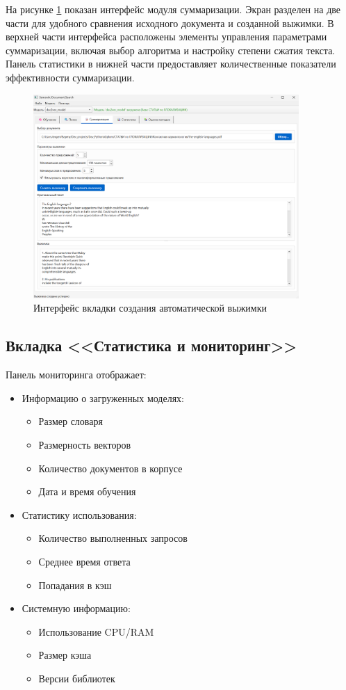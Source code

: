 На рисунке \ref{vizhimka} показан интерфейс модуля суммаризации. Экран разделен на две части для удобного сравнения исходного документа и созданной выжимки. В верхней части интерфейса расположены элементы управления параметрами суммаризации, включая выбор алгоритма и настройку степени сжатия текста. Панель статистики в нижней части предоставляет количественные показатели эффективности суммаризации.
\begin{figure}[H]
	\centering
	\includegraphics[width=0.9\textwidth]{images/vizhimka.png}
	\caption{Интерфейс вкладки создания автоматической выжимки}
	\label{vizhimka}
\end{figure}


\subsection{Вкладка <<Статистика и мониторинг>>}

Панель мониторинга отображает:
\begin{itemize}
	\item Информацию о загруженных моделях:
	\begin{itemize}
		\item Размер словаря
		\item Размерность векторов
		\item Количество документов в корпусе
		\item Дата и время обучения
	\end{itemize}
	\item Статистику использования:
	\begin{itemize}
		\item Количество выполненных запросов
		\item Среднее время ответа
		\item Попадания в кэш
	\end{itemize}
	\item Системную информацию:
	\begin{itemize}
		\item Использование CPU/RAM
		\item Размер кэша
		\item Версии библиотек
	\end{itemize}
\end{itemize}

